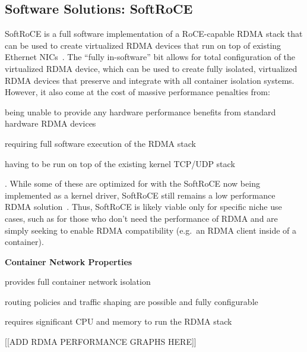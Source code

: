 \documentclass[12pt,titlepage]{article}
\begin{document}
\subsection{Software Solutions: SoftRoCE}
SoftRoCE is a full software implementation of a RoCE-capable RDMA stack that can be used to create virtualized RDMA devices that run on top of existing Ethernet NICs~\cite{softroceoverview}. 
The ``fully in-software'' bit allows for total configuration of the virtualized RDMA device, which can be used to create fully isolated, virtualized RDMA devices that preserve and integrate with all container isolation systems.
However, it also come at the cost of massive performance penalties from: 
\begin{enumerate*}[label={(\arabic*)},itemjoin*={{, and }},itemjoin={{, }}]
	\item being unable to provide any hardware performance benefits from standard hardware RDMA devices
	\item requiring full software execution of the RDMA stack
	\item having to be run on top of the existing kernel TCP/UDP stack
\end{enumerate*}.
While some of these are optimized for with the SoftRoCE now being implemented as a kernel driver, SoftRoCE still remains a low performance RDMA solution~\cite{softrocedriver}.
Thus, SoftRoCE is likely viable only for specific niche use cases, such as for those who don't need the performance of RDMA and are simply seeking to enable RDMA compatibility (e.g.\ an RDMA client inside of a container).

\noindent
\textbf{Container Network Properties}
\begin{description}[nolistsep,font={{\scshape\bfseries}}]
	\item[Network Isolation] provides full container network isolation
	\item[Controllability] routing policies and traffic shaping are possible and fully configurable
	\item[Resource Utilization] requires significant CPU and memory to run the RDMA stack
\end{description}

[[ADD RDMA PERFORMANCE GRAPHS HERE]]
\end{document}
